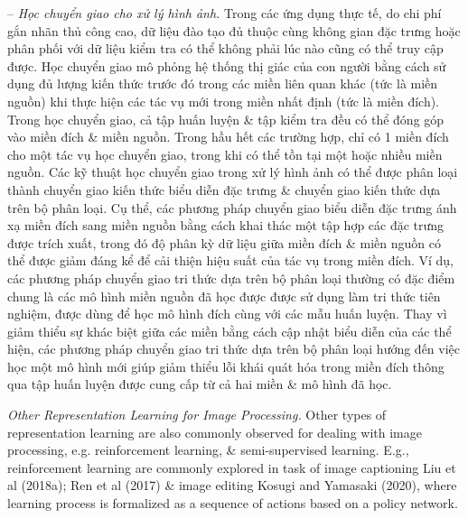 \documentclass{article}
\begin{document}
\begin{itemize}
\begin{itemize}
\begin{itemize}
            -- {\it Học chuyển giao cho xử lý hình ảnh.} Trong các ứng dụng thực tế, do chi phí gắn nhãn thủ công cao, dữ liệu đào tạo đủ thuộc cùng không gian đặc trưng hoặc phân phối với dữ liệu kiểm tra có thể không phải lúc nào cũng có thể truy cập được. Học chuyển giao mô phỏng hệ thống thị giác của con người bằng cách sử dụng đủ lượng kiến thức trước đó trong các miền liên quan khác (tức là miền nguồn) khi thực hiện các tác vụ mới trong miền nhất định (tức là miền đích). Trong học chuyển giao, cả tập huấn luyện \& tập kiểm tra đều có thể đóng góp vào miền đích \& miền nguồn. Trong hầu hết các trường hợp, chỉ có 1 miền đích cho một tác vụ học chuyển giao, trong khi có thể tồn tại một hoặc nhiều miền nguồn. Các kỹ thuật học chuyển giao trong xử lý hình ảnh có thể được phân loại thành chuyển giao kiến thức biểu diễn đặc trưng \& chuyển giao kiến thức dựa trên bộ phân loại. Cụ thể, các phương pháp chuyển giao biểu diễn đặc trưng ánh xạ miền đích sang miền nguồn bằng cách khai thác một tập hợp các đặc trưng được trích xuất, trong đó độ phân kỳ dữ liệu giữa miền đích \& miền nguồn có thể được giảm đáng kể để cải thiện hiệu suất của tác vụ trong miền đích. Ví dụ, các phương pháp chuyển giao tri thức dựa trên bộ phân loại thường có đặc điểm chung là các mô hình miền nguồn đã học được được sử dụng làm tri thức tiên nghiệm, được dùng để học mô hình đích cùng với các mẫu huấn luyện. Thay vì giảm thiểu sự khác biệt giữa các miền bằng cách cập nhật biểu diễn của các thể hiện, các phương pháp chuyển giao tri thức dựa trên bộ phân loại hướng đến việc học một mô hình mới giúp giảm thiểu lỗi khái quát hóa trong miền đích thông qua tập huấn luyện được cung cấp từ cả hai miền \& mô hình đã học.

            {\it Other Representation Learning for Image Processing.} Other types of representation learning are also commonly observed for dealing with image processing, e.g. reinforcement learning, \& semi-supervised learning. E.g., reinforcement learning are commonly explored in task of image captioning Liu et al (2018a); Ren et al (2017) \& image editing Kosugi and Yamasaki (2020), where learning process is formalized as a sequence of actions based on a policy network.


\end{itemize}
\end{itemize}
\end{itemize}
\end{document}
